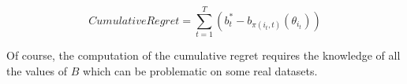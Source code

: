 \documentclass[twoside,leqno,twocolumn]{article}
\newcommand{\pp}[1]{\color{red}(pp) #1\color{black}}
\newcommand{\jm}[1]{{\color{TealBlue}(jm) #1\color{black}}}
\newcommand{\hai}[1]{\color{blue}(hai) #1\color{black}}
\begin{document}
$$ 
  CumulativeRegret = \sum_{t=1}^{T}(b^{*}_{t}-b_{\pi(i_t,t)}(\theta_{i{_t}}))
$$

Of course, the computation of the cumulative regret requires the knowledge of all the values of $B$ which can be problematic on some real datasets. 
 







%
%
%
%
%
\end{document}
